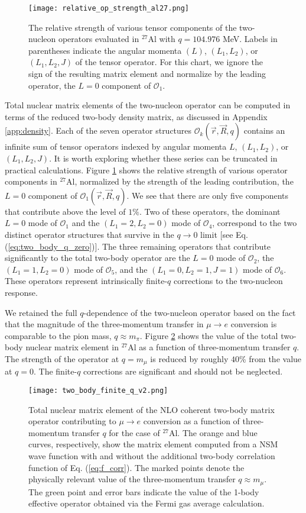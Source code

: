 \documentclass[12pt,letterpaper]{book}
\begin{document}
\begin{figure}
\centering
\texttt{[image: relative\_op\_strength\_al27.png]}
\caption{The relative strength of various tensor components of the two-nucleon operators evaluated in $^{27}$Al with $q = 104.976$ MeV. Labels in parentheses indicate the angular momenta $(L)$, $(L_1, L_2)$, or $(L_1, L_2, J)$ of the tensor operator. For this chart, we ignore the sign of the resulting matrix element and normalize by the leading operator, the $L=0$ component of $\mathcal{O}_1$.}
\label{fig:rel_op_str}
\end{figure}
Total nuclear matrix elements of the two-nucleon operator can be computed in terms of the reduced two-body density matrix, as discussed in Appendix \ref{app:density}. Each of the seven operator structures $\mathcal{O}_k(\vec{r},\vec{R},q)$ contains an infinite sum of tensor operators indexed by angular momenta $L$, $(L_1,L_2)$, or $(L_1,L_2,J)$. It is worth exploring whether these series can be truncated in practical calculations. Figure \ref{fig:rel_op_str} shows the relative strength of various operator components in $^{27}$Al, normalized by the strength of the leading contribution, the $L=0$ component of $\mathcal{O}_1(\vec{r},\vec{R},q)$. We see that there are only five components that contribute above the level of $1\%$. Two of these operators, the dominant $L=0$ mode of $\mathcal{O}_1$ and the $(L_1=2,L_2=0)$ mode of $\mathcal{O}_4$, correspond to the two distinct operator structures that survive in the $q\rightarrow 0$ limit [see Eq. (\ref{eq:two_body_q_zero})]. The three remaining operators that contribute significantly to the total two-body operator are the $L=0$ mode of $\mathcal{O}_2$, the $(L_1=1,L_2=0)$ mode of $\mathcal{O}_5$, and the $(L_1=0,L_2=1,J=1)$ mode of $\mathcal{O}_6$. These operators represent intrinsically finite-$q$ corrections to the two-nucleon response.

We retained the full $q$-dependence of the two-nucleon operator based on the fact that the magnitude of the three-momentum transfer in $\mu\rightarrow e$ conversion is comparable to the pion mass, $q\approx m_{\pi}$. Figure \ref{fig:two_body_finite_q} shows the value of the total two-body nuclear matrix element in $^{27}$Al as a function of three-momentum transfer $q$. The strength of the operator at $q=m_{\mu}$ is reduced by roughly $40$\% from the value at $q=0$. The finite-$q$ corrections are significant and should not be neglected.

\begin{figure}
\centering
\texttt{[image: two\_body\_finite\_q\_v2.png]}
\caption{Total nuclear matrix element of the NLO coherent two-body matrix operator contributing to $\mu\rightarrow e$ conversion as a function of three-momentum transfer $q$ for the case of $^{27}$Al. The orange and blue curves, respectively, show the matrix element computed from a NSM wave function with and without the additional two-body correlation function of Eq. (\ref{eq:f_corr}). The marked points denote the physically relevant value of the three-momentum transfer $q\approx m_{\mu}$. The green point and error bars indicate the value of the 1-body effective operator obtained via the Fermi gas average calculation.}
\label{fig:two_body_finite_q}
\end{figure} 
\end{document}
